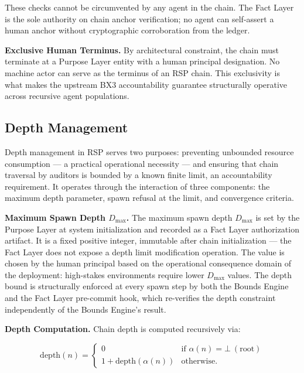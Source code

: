 These checks cannot be circumvented by any agent in the chain. The Fact Layer is the sole authority on chain anchor verification; no agent can self-assert a human anchor without cryptographic corroboration from the ledger.

\bigskip
\noindent\textbf{Exclusive Human Terminus.} By architectural constraint, the chain must terminate at a Purpose Layer entity with a human principal designation. No machine actor can serve as the terminus of an RSP chain. This exclusivity is what makes the upstream BX3 accountability guarantee structurally operative across recursive agent populations.

\subsection{Depth Management}

Depth management in RSP serves two purposes: preventing unbounded resource consumption — a practical operational necessity — and ensuring that chain traversal by auditors is bounded by a known finite limit, an accountability requirement. It operates through the interaction of three components: the maximum depth parameter, spawn refusal at the limit, and convergence criteria.

\bigskip
\noindent\textbf{Maximum Spawn Depth $D_{\max}$.} The maximum spawn depth $D_{\max}$ is set by the Purpose Layer at system initialization and recorded as a Fact Layer authorization artifact. It is a fixed positive integer, immutable after chain initialization — the Fact Layer does not expose a depth limit modification operation. The value is chosen by the human principal based on the operational consequence domain of the deployment: high-stakes environments require lower $D_{\max}$ values. The depth bound is structurally enforced at every spawn step by both the Bounds Engine and the Fact Layer pre-commit hook, which re-verifies the depth constraint independently of the Bounds Engine's result.

\bigskip
\noindent\textbf{Depth Computation.} Chain depth is computed recursively via:

\begin{equation}
\mathrm{depth}(n) =
\begin{cases}
0 & \text{if }\alpha(n) = \bot\ (\text{root}) \\[6pt]
1 + \mathrm{depth}(\alpha(n)) & \text{otherwise}.
\end{cases}
\label{eq:rs-depth-computation}
\end{equation}

